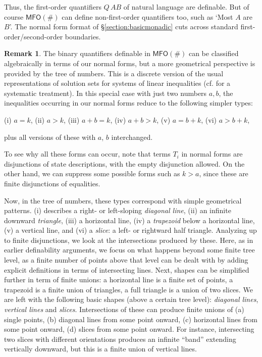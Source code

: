 \documentclass[12pt,oneside,reqno]{amsart}
\theoremstyle{definition}
\newtheorem{remark}{Remark}
\begin{document}
Thus, the first-order quantifiers $Q\, AB$ of natural language are definable. But of course $\mathsf{MFO}(\#)$ can define non-first-order quantifiers too, such as `Most $A$ are $B$'. The normal form format of \S\ref{section:basicmonadic} cuts across standard first-order/second-order boundaries.

\begin{remark} \label{remark:ton} The binary quantifiers definable in $\mathsf{MFO(\#)}$ can be classified algebraically in terms of our normal forms, but a more geometrical perspective is provided by  the tree of numbers. This is a discrete version of the usual representations of solution sets for systems of linear inequalities (cf. \citealt[p. 85]{Schrijver} for a systematic treatment). In this special case with just two numbers $a, b$, the  inequalities occurring in our normal forms reduce to the following simpler types:

\vspace{1ex}

(i) $a = k$, (ii) $a > k$, (iii) $a + b = k$, (iv) $a + b > k$, (v)  $a = b + k$, (vi) $a > b + k$,

plus all versions of these with $a$, $b$ interchanged.

\vspace{1ex}

\noindent To see why all these forms can occur, note that terms $T_i$ in normal forms are disjunctions of state descriptions, with the empty disjunction allowed. On the other hand, we can suppress some  possible forms such as $k > a$, since these are finite disjunctions of equalities. 

Now, in the tree of numbers, these types correspond with simple  geometrical patterns. (i) describes a right- or left-sloping \emph{diagonal line}, (ii) an infinite downward \emph{triangle}, (iii) a horizontal line, (iv) a \emph{trapezoid} below a horizontal line, (v) a vertical line, and (vi) a \emph{slice}: a left- or rightward half triangle.  Analyzing up to finite disjunctions, we  look at the intersections produced by these. Here, as in earlier definability arguments, we focus on  what happens beyond some finite tree level, as a finite number of  points above that level can  be dealt with by adding  explicit definitions in terms of intersecting lines. Next,   shapes can be simplified further in term of finite unions: a horizontal line is a finite set of points, a trapezoid is a finite union of triangles, a full triangle is a union of two slices. We are left with the following basic shapes (above a certain tree level): \emph{diagonal lines}, \emph{vertical lines} and \emph{slices}. Intersections of these can produce finite unions of (a) single points, (b) diagonal lines from some point onward,  (c) horizontal lines from some point onward, (d) slices from some point onward.  For instance, intersecting two slices with different orientations produces an infinite ``band'' extending vertically downward,  but this is a finite union of vertical lines. 


\end{remark}
\end{document}
